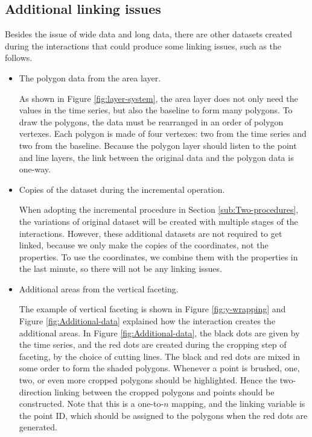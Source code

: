\documentclass[12pt]{article}
\begin{document}
\subsection{Additional linking issues\label{sub:Linking-of-the-addition}}

Besides the issue of wide data and long data, there are other datasets
created during the interactions that could produce some linking issues,
such as the follows.
\begin{itemize}
\item The polygon data from the area layer. 

As shown in Figure \ref{fig:layer-system}, the area layer does not
only need the values in the time series, but also the baseline to
form many polygons. To draw the polygons, the data must be rearranged
in an order of polygon vertexes. Each polygon is made of four vertexes:
two from the time series and two from the baseline. Because the polygon
layer should listen to the point and line layers, the link between
the original data and the polygon data is one-way.

\item Copies of the dataset during the incremental operation.

When adopting the incremental procedure in Section 
\ref{sub:Two-procedures}, the variations of original dataset will
be created with multiple stages of the interactions. However, these
additional datasets are not required to get linked, because we only
make the copies of the coordinates, not the properties. To use the
coordinates, we combine them with the properties in the last minute,
so there will not be any linking issues.

\item Additional areas from the vertical faceting.

The example of vertical faceting is shown in Figure \ref{fig:y-wrapping}
and Figure \ref{fig:Additional-data} explained how the interaction
creates the additional areas. In Figure \ref{fig:Additional-data},
the black dots are given by the time series, and the red dots are
created during the cropping step of faceting, by the choice of
cutting lines. The black and red dots are mixed in some order to
form the shaded polygons. Whenever a point is brushed, one, two,
or even more cropped polygons should be highlighted. Hence the
two-direction linking between the cropped polygons and points
should be constructed. Note that this is a one-to-$n$ mapping,
and the linking variable is the point ID, which should be assigned
to the polygons when the red dots are generated.


\end{itemize}
\end{document}
